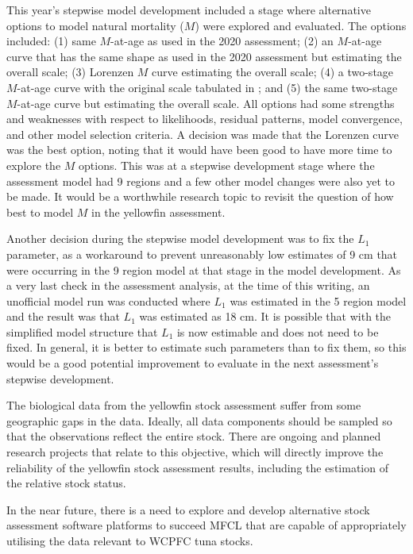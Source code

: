This year's stepwise model development included a stage where alternative options to model natural mortality ($M$) were explored and evaluated. The options included: (1) same $M$-at-age as used in the 2020 assessment; (2) an $M$-at-age curve that has the same shape as used in the 2020 assessment but estimating the overall scale; (3) Lorenzen $M$ curve estimating the overall scale; (4) a two-stage $M$-at-age curve with the original scale tabulated in \cite{hoyle_approaches_2023}; and (5) the same two-stage $M$-at-age curve but estimating the overall scale. All options had some strengths and weaknesses with respect to likelihoods, residual patterns, model convergence, and other model selection criteria. A decision was made that the Lorenzen curve was the best option, noting that it would have been good to have more time to explore the $M$ options. This was at a stepwise development stage where the assessment model had 9 regions and a few other model changes were also yet to be made. It would be a worthwhile research topic to revisit the question of how best to model $M$ in the yellowfin assessment.

Another decision during the stepwise model development was to fix the $L_1$ parameter, as a workaround to prevent unreasonably low estimates of 9 cm that were occurring in the 9 region model at that stage in the model development. As a very last check in the assessment analysis, at the time of this writing, an unofficial model run was conducted where $L_1$ was estimated in the 5 region model and the result was that $L_1$ was estimated as 18 cm. It is possible that with the simplified model structure that $L_1$ is now estimable and does not need to be fixed. In general, it is better to estimate such parameters than to fix them, so this would be a good potential improvement to evaluate in the next assessment's stepwise development.

The biological data from the yellowfin stock assessment suffer from some geographic gaps in the data. Ideally, all data components should be sampled so that the observations reflect the entire stock. There are ongoing and planned research projects that relate to this objective, which will directly improve the reliability of the yellowfin stock assessment results, including the estimation of the relative stock status.

In the near future, there is a need to explore and develop alternative stock assessment software platforms to succeed MFCL that are capable of appropriately utilising the data relevant to WCPFC tuna stocks.

